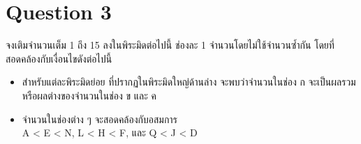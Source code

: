 \newpage
{}
\section{Question 3}

จงเติมจำนวนเต็ม 1 ถึง 15 ลงในพิระมิดต่อไปนี้ ช่องละ 1 จำนวนโดยไม่ใช้จำนวนซ้ำกัน โดยที่สอดคล้องกับเงื่อนไขดังต่อไปนี้

\begin{minipage}{0.4\linewidth}
    \begin{itemize}[topsep=0pc,itemsep=0pc,leftmargin=0pc]
        \item สำหรับแต่ละพิระมิดย่อย  ที่ปรากฏในพิระมิดใหญ่ด้านล่าง จะพบว่าจำนวนในช่อง ก จะเป็นผลรวมหรือผลต่างของจำนวนในช่อง ข และ ค
        \item จำนวนในช่องต่าง ๆ จะสอดคล้องกับอสมการ \\ A < E < N, L < H < F, และ Q < J < D
    \end{itemize}
    \vspace*{4pc}
\end{minipage}
